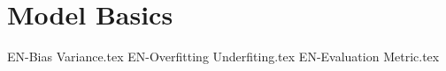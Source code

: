 \chapterspaceabove{6.75cm} %
\chapterspacebelow{7.25cm} %


\chapter{Model Basics}
{EN-Bias Variance.tex}
{EN-Overfitting Underfiting.tex}
{EN-Evaluation Metric.tex}
